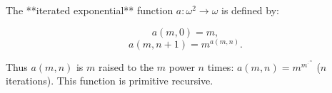 The **iterated exponential** function $a : \omega^2 \to \omega$ is defined by:

$$a(m, 0) = m,$$
$$a(m, n + 1) = m^{a(m, n)}.$$

Thus $a(m, n)$ is $m$ raised to the $m$ power $n$ times: $a(m, n) = m^{m^{\cdot^{\cdot^{m}}}}$ ($n$ iterations). This function is primitive recursive.
